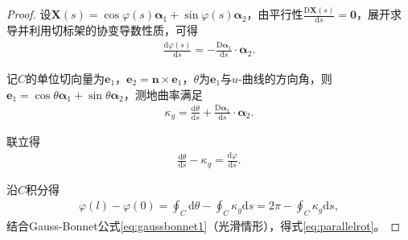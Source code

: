 \documentclass[../../main.tex]{subfiles}%
\begin{document}
\begin{proof}
设$\boldsymbol{X}(s)=\cos\varphi(s)\boldsymbol{\alpha}_1+\sin\varphi(s)\boldsymbol{\alpha}_2$，由平行性$\frac{\mathrm{D}\boldsymbol{X}(s)}{\mathrm{d}s}=\boldsymbol{0}$，展开求导并利用切标架的协变导数性质，可得
\begin{align*}
\frac{\mathrm{d}\varphi(s)}{\mathrm{d}s}=-\frac{\mathrm{D}\boldsymbol{\alpha}_1}{\mathrm{d}s}\cdot\boldsymbol{\alpha}_2.
\end{align*}

记$C$的单位切向量为$\boldsymbol{e}_1$，$\boldsymbol{e}_2=\boldsymbol{n}\times\boldsymbol{e}_1$，$\theta$为$\boldsymbol{e}_1$与$u$-曲线的方向角，则$\boldsymbol{e}_1=\cos\theta\boldsymbol{\alpha}_1+\sin\theta\boldsymbol{\alpha}_2$，测地曲率满足
\begin{align*}
\kappa_g=\frac{\mathrm{d}\theta}{\mathrm{d}s}+\frac{\mathrm{D}\boldsymbol{\alpha}_1}{\mathrm{d}s}\cdot\boldsymbol{\alpha}_2.
\end{align*}

联立得
\begin{align*}
\frac{\mathrm{d}\theta}{\mathrm{d}s}-\kappa_g=\frac{\mathrm{d}\varphi}{\mathrm{d}s}.
\end{align*}

沿$C$积分得
\begin{align*}
\varphi(l)-\varphi(0)=\oint_{C}\mathrm{d}\theta-\oint_{C}\kappa_g\mathrm{d}s=2\pi-\oint_{C}\kappa_g\mathrm{d}s,
\end{align*}
结合Gauss-Bonnet公式\eqref{eq:gaussbonnet1}（光滑情形），得式\eqref{eq:parallelrot}。
\end{proof}
\end{document}
